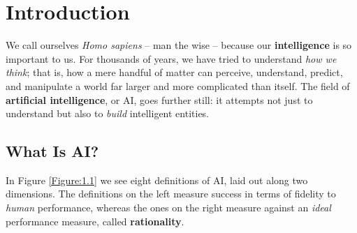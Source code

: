 \documentclass[a4paper,10pt,twoside]{book}
\begin{document}

\restoregeometry
\thispagestyle{empty}
\setcounter{page}{0}
\tableofcontents
\thispagestyle{empty}
\setcounter{page}{0}


\chapter{Introduction}

We call ourselves \textit{Homo sapiens} -- man the wise -- because our \textbf{intelligence} is so important to us. For thousands of years, we have tried to understand \textit{how we think}; that is, how a mere handful of matter can perceive, understand, predict, and manipulate a world far larger and more complicated than itself. The field of \textbf{artificial intelligence}, or AI, goes further still: it attempts not just to understand but also to \textit{build} intelligent entities.

\section{What Is AI?}

In Figure \ref{Figure:1.1} we see eight definitions of AI, laid out along two dimensions. The definitions on the left measure success in terms of fidelity to \textit{human} performance, whereas the ones on the right measure against an \textit{ideal} performance measure, called \textbf{rationality}.
\end{document}
